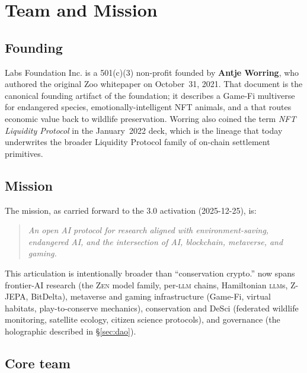 \section{Team and Mission}
\label{sec:team}

\subsection{Founding}

\Zoo{} Labs Foundation Inc. is a 501(c)(3) non-profit founded by
\textbf{Antje Worring}, who authored the original Zoo whitepaper on
October~31, 2021. That document is the canonical founding artifact of
the foundation; it describes a Game-Fi multiverse for endangered species,
emotionally-intelligent NFT animals, and a \DAO{} that routes economic
value back to wildlife preservation. Worring also coined the term
\emph{NFT Liquidity Protocol} in the January~2022 deck, which is the
lineage that today underwrites the broader Liquidity Protocol family of
on-chain settlement primitives.

\subsection{Mission}

The \Zoo{} mission, as carried forward to the \Quasar{} 3.0 activation
(2025-12-25), is:

\begin{quote}\itshape
An open AI protocol for research aligned with environment-saving,
endangered AI, and the intersection of AI, blockchain, metaverse, and
gaming.
\end{quote}

This articulation is intentionally broader than ``conservation crypto.''
\Zoo{} now spans frontier-AI research (the \textsc{Zen} model family,
per-\textsc{llm} chains, Hamiltonian \textsc{llm}s, Z-JEPA, BitDelta),
metaverse and gaming infrastructure (Game-Fi, virtual habitats,
play-to-conserve mechanics), conservation and DeSci (federated wildlife
monitoring, satellite ecology, citizen science protocols), and
governance (the holographic \DAO{} described in \S\ref{sec:dao}).

\subsection{Core team}

